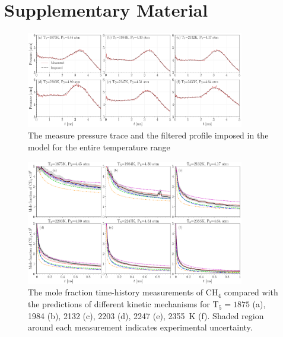 \clearpage
\onecolumn
\setcounter{page}{1}
\beginsupplement
\section*{Supplementary Material}

\begin{flushleft}
	\vspace*{1cm} %
	\textbf{\LARGE \papertitle} 
\end{flushleft}



\begin{figure}[H]
	\centering
	\includegraphics[width=0.85\textwidth]{Figures/pressure.pdf}
	\caption{The measure pressure trace and the filtered profile imposed in the model for the entire temperature range}
	\label{fig:pressureprofiles} 
\end{figure}


\begin{figure}[H]
	\centering
	\includegraphics[width=0.85\textwidth]{Figures/CH4_all.pdf}
	\caption{The mole fraction time-history measurements of $\mathrm{CH_4}$ compared with the predictions of different kinetic mechanisms for $\mathrm{T_5}=1875$ (a), 1984 (b), 2132 (c), 2203 (d), 2247 (e), 2355~K (f). Shaded region around each measurement indicates experimental uncertainty.}
	\label{fig:ch4_all} 
\end{figure}

